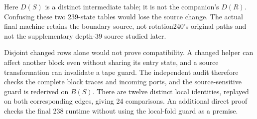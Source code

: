 Here $D(S)$ is a distinct intermediate table; it is not the companion's
$D(R)$. Confusing these two 239-state tables would lose the source change.
The actual final machine retains the boundary source, not rotation240's
original paths and not the supplementary depth-39 source studied later.

Disjoint changed rows alone would not prove compatibility. A changed
helper can affect another block even without sharing its entry state,
and a source transformation can invalidate a tape guard. The independent
audit therefore checks the complete block traces and incoming ports,
and the source-sensitive guard is rederived on $B(S)$. There are twelve
distinct local identities, replayed on both corresponding edges, giving
24 comparisons. An additional direct proof checks the final 238 runtime
without using the local-fold guard as a premise.
